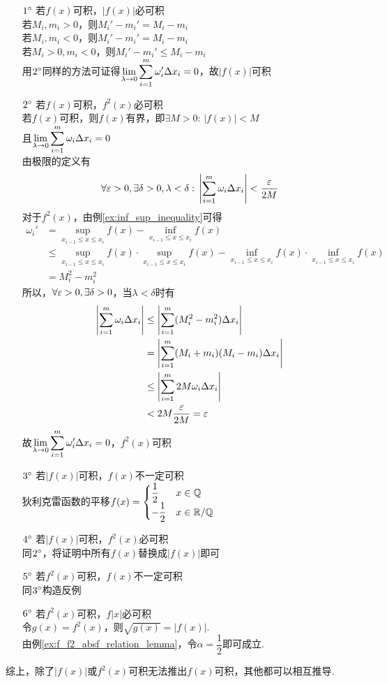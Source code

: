 \begin{analysis}
\begin{enumerate}
	\item[$1\degree$] 若$f(x)$可积，$|f(x)|$必可积\\
若$M_i,m_i>0$，则$M_i'-m_i'=M_i-m_i$\\
若$M_i,m_i<0$，则$M_i'-m_i'=M_i-m_i$\\
若$M_i>0,m_i<0$，则$M_i'-m_i'\leq M_i-m_i$\\
用$2\degree$同样的方法可证得$\displaystyle\lim_{\lambda\to 0}\sum_{i=1}^m\omega'_i\Delta x_i=0$，故$|f(x)|$可积
	\item[$2\degree$] 若$f(x)$可积，$f^2(x)$必可积\\
若$f(x)$可积，则$f(x)$有界，即$\exists M>0:\,|f(x)|<M$\\
且$\displaystyle\lim_{\lambda\to 0}\sum_{i=1}^m\omega_i\Delta x_i=0$\\
由极限的定义有
\[\forall\varepsilon>0,\exists\delta>0,\lambda<\delta:\,\left|\sum_{i=1}^m\omega_i\Delta x_i\right|<\dfrac{\varepsilon}{2M}\]
对于$f^2(x)$，由例\ref{ex:inf_sup_inequality}可得
\[\begin{aligned}
\omega_i'&=\sup_{x_{i-1}\leq x\leq x_i}f(x)-\inf_{x_{i-1}\leq x\leq x_i}f(x)\\
&\leq \sup_{x_{i-1}\leq x\leq x_i}f(x)\cdot\sup_{x_{i-1}\leq x\leq x_i}f(x)-
\inf_{x_{i-1}\leq x\leq x_i}f(x)\cdot\inf_{x_{i-1}\leq x\leq x_i}f(x)\\
&=M_i^2-m_i^2
\end{aligned}\]
所以，$\forall\varepsilon>0,\exists\delta>0$，当$\lambda<\delta$时有
\[\begin{aligned}
\left|\sum_{i=1}^m\omega_i\Delta x_i\right|&\leq\left|\sum_{i=1}^m(M_i^2-m_i^2)\Delta x_i\right|\\
&=\left|\sum_{i=1}^m(M_i+m_i)(M_i-m_i)\Delta x_i\right|\\
&\leq\left|\sum_{i=1}^m2M\omega_i\Delta x_i\right|\\
&<2M\dfrac{\varepsilon}{2M}=\varepsilon
\end{aligned}\]
故$\displaystyle\lim_{\lambda\to 0}\sum_{i=1}^m\omega'_i\Delta x_i=0$，$f^2(x)$可积
	\item[$3\degree$] 若$|f(x)|$可积，$f(x)$不一定可积\\
狄利克雷函数的平移$f(x)=\begin{cases}\dfrac{1}{2}&x\in\mathbb{Q}\\
-\dfrac{1}{2}&x\in\mathbb{R}/\mathbb{Q}\end{cases}$
	\item[$4\degree$] 若$|f(x)|$可积，$f^2(x)$必可积\\
同$2\degree$，将证明中所有$f(x)$替换成$|f(x)|$即可
	\item[$5\degree$] 若$f^2(x)$可积，$f(x)$不一定可积\\
同$3\degree$构造反例
	\item[$6\degree$] 若$f^2(x)$可积，$f|x|$必可积\\
令$g(x)=f^2(x)$，则$\sqrt{g(x)}=|f(x)|$.\\
由例\ref{ex:f_f2_absf_relation_lemma}，令$\alpha=\dfrac{1}{2}$即可成立.
\end{enumerate}
\par 综上，除了$|f(x)|$或$f^2(x)$可积无法推出$f(x)$可积，其他都可以相互推导.
\end{analysis}

